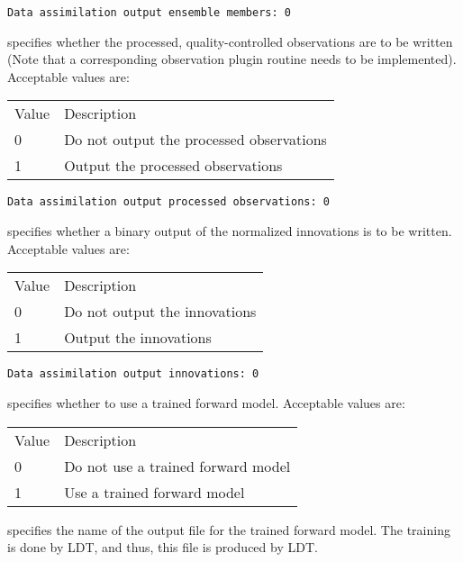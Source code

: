  \begin{Verbatim}[frame=single]
Data assimilation output ensemble members: 0
 \end{Verbatim}

 
  specifies
 whether the processed, quality-controlled
 observations are to be written (Note that a corresponding observation
 plugin routine needs to be implemented).
 Acceptable values are:

 \begin{tabular}{ll}
 Value & Description                               \\
 0     &  Do not output the processed observations \\
 1     &  Output the processed observations        \\
 \end{tabular}
 

 \begin{Verbatim}[frame=single]
Data assimilation output processed observations: 0
 \end{Verbatim}

 
  specifies whether
 a binary output of the normalized innovations is to be written. 
 Acceptable values are:

 \begin{tabular}{ll}
 Value & Description                    \\
 0     &  Do not output the innovations \\
 1     &  Output the innovations        \\
 \end{tabular}
 

 \begin{Verbatim}[frame=single]
Data assimilation output innovations: 0
 \end{Verbatim}

 
  specifies whether
 to use a trained forward model.
 Acceptable values are:

 \begin{tabular}{ll}
 Value & Description                         \\
 0     &  Do not use a trained forward model \\
 1     &  Use a trained forward model        \\
 \end{tabular}

  specifies
 the name of the output file for the trained forward model.
 The training is done by LDT, and thus, this file is produced by LDT.
 


